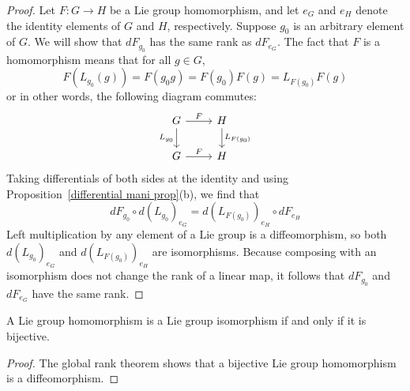 \begin{proof}
Let $F:G\to H$ be a Lie group homomorphism, and let $e_G$ and $e_H$ denote the identity elements of $G$ and $H$, respectively. Suppose $g_0$ is an arbitrary element of $G$. We will show that $dF_{g_0}$ has the same rank as $dF_{e_G}$. The fact that $F$ is a homomorphism means that for all $g\in G$,
\[F(L_{g_0}(g))=F(g_0g)=F(g_0)F(g)=L_{F(g_0)}F(g)\]
or in other words, the following diagram commutes:
\[\begin{tikzcd}
G\ar[r,"F"]\ar[d,swap,"L_{g_0}"]&H\ar[d,"L_{F(g_0)}"]\\
G\ar[r,"F"]&H
\end{tikzcd}\] 
Taking differentials of both sides at the identity and using Proposition~\ref{differential mani prop}(b), we find that
\[dF_{g_0}\circ d(L_{g_0})_{e_G}=d(L_{F(g_0)})_{e_H}\circ dF_{e_H}\]
Left multiplication by any element of a Lie group is a diffeomorphism, so both $d(L_{g_0})_{e_G}$ and $d(L_{F(g_0)})_{e_H}$ are isomorphisms. Because composing with an isomorphism does not change the rank of a linear map, it follows that $dF_{g_0}$ and $dF_{e_G}$ have the same rank.
\end{proof}
\begin{corollary}\label{Lie isomorphism iff}
A Lie group homomorphism is a Lie group isomorphism if and only if it is bijective.
\end{corollary}
\begin{proof}
The global rank theorem shows that a bijective Lie group homomorphism is a diffeomorphism.
\end{proof}
